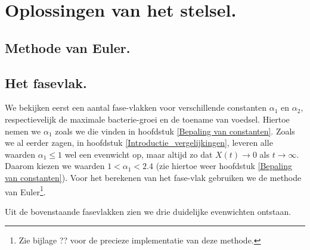 
\chapter{Oplossingen van het stelsel.}
\label{Oplossingen van het stelsel}

\section{Methode van Euler.}


\section{Het fasevlak.}

We bekijken eerst een aantal fase-vlakken voor verschillende constanten $\alpha_1$ en $\alpha_2$, respectievelijk de maximale bacterie-groei en de toename van voedsel. Hiertoe nemen we $\alpha_1$ zoals we die vinden in hoofdstuk \ref{Bepaling van constanten}. Zoals we al eerder zagen, in hoofdstuk \ref{Introductie_vergelijkingen}, leveren alle waarden $ \alpha_1 \leq 1$ wel een evenwicht op, maar altijd zo dat $X(t) \to 0$ als $t\to\infty$. Daarom kiezen we waarden $1 < \alpha_1  < 2.4$ (zie hiertoe weer hoofdstuk \ref{Bepaling van constanten}). Voor het berekenen van het fase-vlak gebruiken we de methode van Euler\footnote{Zie bijlage ?? voor de precieze implementatie van deze methode.}.




Uit de bovenstaande fasevlakken zien we drie duidelijke evenwichten ontstaan. 

